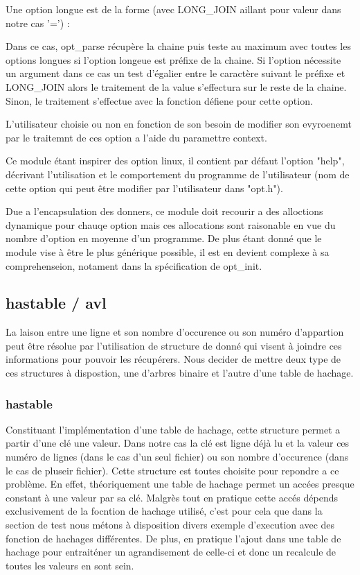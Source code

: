 \documentclass[12pt]{article}
\begin{document}
        Une option longue est de la forme (avec LONG\_JOIN aillant pour valeur dans notre cas '=') :


        Dans ce cas,  opt\_parse récupère la chaine puis teste au maximum avec toutes les options longues si l'option longeue est préfixe de la chaine. 
        Si l'option nécessite un argument dans ce cas un test d'égalier entre le caractère suivant le préfixe et LONG\_JOIN alors le traitement de la value s'effectura sur le reste de la chaine.   
        Sinon, le traitement s'effectue avec la fonction défiene pour cette option.

        L'utilisateur choisie ou non en fonction de son besoin de modifier son evyroenemt par le traitemnt de ces option a l'aide du paramettre context.

        Ce module étant inspirer des option linux, il contient par défaut l'option "help", décrivant l'utilisation et le comportement du programme de l'utilisateur (nom de cette option qui peut être modifier par l'utilisateur dans "opt.h"). 

        Due a l'encapsulation des donners, ce module doit recourir a des alloctions dynamique pour chauqe option mais ces allocations sont raisonable en vue du nombre d'option en moyenne d'un programme. De plus étant donné que le module vise à être le plus générique possible, il est en devient complexe à sa comprehenseion, notament dans la spécification de opt\_init. 

    \subsection{hastable / avl}

    La laison entre une ligne et son nombre d'occurence ou son numéro d'appartion peut être résolue par l'utilisation de structure de donné qui visent à joindre ces informations pour pouvoir les récupérers. Nous decider de mettre deux type de ces structures à dispostion, une d'arbres binaire et l'autre d'une table de hachage. 

    \subsubsection{hastable}

    Constituant l'implémentation d'une table de hachage, cette structure permet a partir d'une clé une valeur. Dans notre cas la clé est ligne déjà lu et la valeur ces numéro de lignes (dans le cas d'un seul fichier) ou son nombre d'occurence (dans le cas de pluseir fichier). Cette structure est toutes choisite pour repondre a ce problème. En effet, théoriquement une table de hachage permet un accées presque constant à une valeur par sa clé. Malgrès tout en pratique cette accés dépends exclusivement de la focntion de hachage utilisé, c'est pour cela que dans la section de test nous métons à disposition divers exemple d'execution avec des fonction de hachages différentes. De plus, en pratique l'ajout dans une table de hachage pour entraiténer un agrandisement de celle-ci et donc un recalcule de toutes les valeurs en sont sein.  
\end{document}
